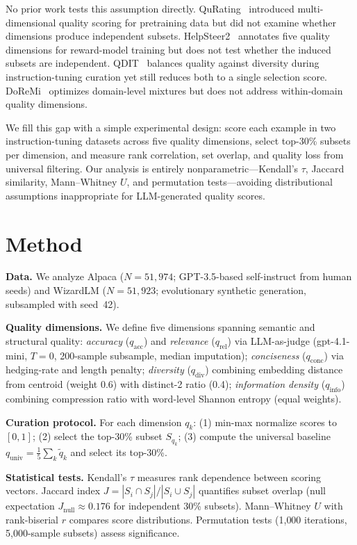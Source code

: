 \documentclass[11pt,a4paper]{article}
\begin{document}
No prior work tests this assumption directly.
QuRating~\cite{wettig2024qurating} introduced multi-dimensional quality scoring for pretraining data but did not examine whether dimensions produce independent subsets.
HelpSteer2~\cite{wang2024helpsteer2} annotates five quality dimensions for reward-model training but does not test whether the induced subsets are independent.
QDIT~\cite{bukharin2024qdit} balances quality against diversity during instruction-tuning curation yet still reduces both to a single selection score.
DoReMi~\cite{xie2023doremi} optimizes domain-level mixtures but does not address within-domain quality dimensions.

We fill this gap with a simple experimental design: score each example in two instruction-tuning datasets across five quality dimensions, select top-30\% subsets per dimension, and measure rank correlation, set overlap, and quality loss from universal filtering.
Our analysis is entirely nonparametric---Kendall's $\tau$, Jaccard similarity, Mann--Whitney $U$, and permutation tests---avoiding distributional assumptions inappropriate for LLM-generated quality scores.

\section{Method}

\textbf{Data.}
We analyze Alpaca ($N = 51{,}974$; GPT-3.5-based self-instruct from human seeds) and WizardLM ($N = 51{,}923$; evolutionary synthetic generation, subsampled with seed~42).

\textbf{Quality dimensions.}
We define five dimensions spanning semantic and structural quality:
\emph{accuracy} ($q_{\text{acc}}$) and \emph{relevance} ($q_{\text{rel}}$) via LLM-as-judge (gpt-4.1-mini, $T=0$, 200-sample subsample, median imputation);
\emph{conciseness} ($q_{\text{conc}}$) via hedging-rate and length penalty;
\emph{diversity} ($q_{\text{div}}$) combining embedding distance from centroid (weight 0.6) with distinct-2 ratio (0.4);
\emph{information density} ($q_{\text{info}}$) combining compression ratio with word-level Shannon entropy (equal weights).

\textbf{Curation protocol.}
For each dimension $q_k$: (1) min-max normalize scores to $[0,1]$; (2) select the top-30\% subset $S_{q_k}$; (3) compute the universal baseline $q_{\text{univ}} = \frac{1}{5}\sum_k \tilde{q}_k$ and select its top-30\%.

\textbf{Statistical tests.}
Kendall's $\tau$ measures rank dependence between scoring vectors.
Jaccard index $J = |S_i \cap S_j| / |S_i \cup S_j|$ quantifies subset overlap (null expectation $J_{\text{null}} \approx 0.176$ for independent 30\% subsets).
Mann--Whitney $U$ with rank-biserial $r$ compares score distributions.
Permutation tests (1{,}000 iterations, 5{,}000-sample subsets) assess significance.
\end{document}
